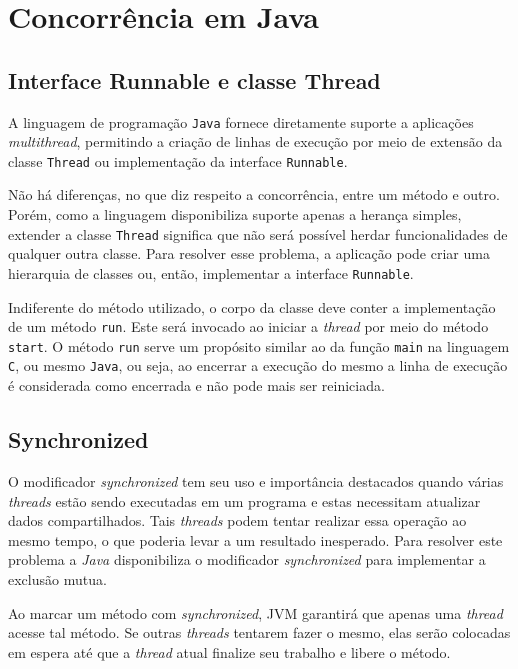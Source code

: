 \chapter{Concorrência em Java}
\label{cha:concjava}

\section{Interface Runnable e classe Thread}

A linguagem de programação \texttt{Java} fornece diretamente suporte a
aplicações \textit{multithread}, permitindo a criação de linhas de
execução por meio de extensão da classe \verb!Thread! ou implementação
da interface \verb!Runnable!.

Não há diferenças, no que diz respeito a concorrência, entre um método
e outro. Porém, como a linguagem disponibiliza suporte apenas a
herança simples, extender a classe \verb!Thread! significa que não
será possível herdar funcionalidades de qualquer outra classe. Para
resolver esse problema, a aplicação pode criar uma hierarquia de
classes ou, então, implementar a interface \verb!Runnable!.

Indiferente do método utilizado, o corpo da classe deve conter a
implementação de um método \verb!run!. Este será invocado ao iniciar a
\textit{thread} por meio do método \verb!start!. O método \verb!run!
serve um propósito similar ao da função \verb!main! na linguagem
\texttt{C}, ou mesmo \texttt{Java}, ou seja, ao encerrar a execução do
mesmo a linha de execução é considerada como encerrada e não pode mais
ser reiniciada.

\section{Synchronized}

O modificador \textit{synchronized} tem seu uso e importância destacados quando
várias \textit{threads} estão sendo executadas em um programa e estas
necessitam atualizar dados compartilhados. Tais \textit{threads} podem
tentar realizar
essa operação ao mesmo tempo, o que poderia levar a um resultado
inesperado. Para resolver este problema a \textit{Java} disponibiliza o
modificador \textit{synchronized} para implementar a exclusão mutua.

Ao marcar um método com \textit{synchronized}, JVM 
garantirá que apenas uma \textit{thread} acesse tal método. Se outras %
\textit{threads} tentarem fazer o mesmo, elas serão colocadas em espera até que a
\textit{thread} atual finalize seu trabalho e libere o método.

